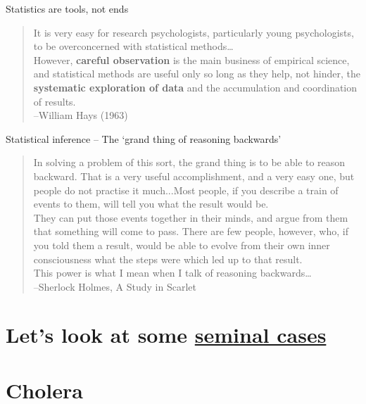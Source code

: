 \documentclass[aspectratio=1610,pdftex,dvipsnames,compress,xcolor={dvipsnames}]{beamer}
\begin{document}
\begin{frame}{Statistics are tools, not ends}
    \begin{quote}
        It is very easy for research psychologists, particularly young psychologists, to be overconcerned with statistical methods\ldots\\
        However, \textbf{careful observation} is the main business of empirical science, and statistical methods are useful only so long as they help, not hinder, the \textbf{systematic exploration of data} and the accumulation and coordination of results.\\
        --William Hays (1963)
    \end{quote}
\end{frame}


\begin{frame}{Statistical inference -- The `grand thing of reasoning backwards'}
    \begin{quote}
        In solving a problem of this sort, the grand thing is to be able to reason backward. That is a very useful accomplishment, and a very easy one, but people do not practise it much...Most people, if you describe a train of events to them, will tell you what the result would be.\\
        They can put those events together in their minds, and argue from them that something will come to pass.  There are few people, however, who, if you told them a result, would be able to evolve from their own inner consciousness what the steps were which led up to that result.\\
        This power is what I mean when I talk of reasoning backwards\ldots\\
        --Sherlock Holmes, A Study in Scarlet
    \end{quote}
\end{frame}


\section{Let's look at some \href{https://uidaho.pressbooks.pub/riskassessment/chapter/probability-and-statistics/}{seminal cases}}


\section{Cholera}
\end{document}
